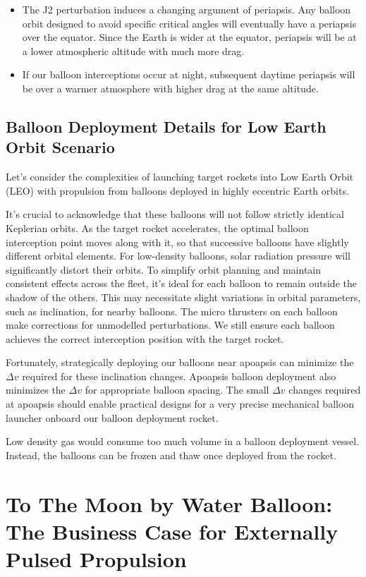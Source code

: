\documentclass{article}
\begin{document}
{\begin{itemize}
\item The J2 perturbation induces a changing argument of periapsis. Any balloon orbit designed to avoid specific critical angles will eventually have a periapsis over the equator.  Since the Earth is wider at the equator, periapsis will be at a lower atmospheric altitude with much more drag.
\item If our balloon interceptions occur at night, subsequent daytime periapsis will be over a warmer atmosphere with higher drag at the same altitude.
\end{itemize}

\subsection{Balloon Deployment Details for Low Earth Orbit Scenario}
Let's consider the complexities of launching target rockets into Low Earth Orbit (LEO) with propulsion from balloons deployed in highly eccentric Earth orbits.

It's crucial to acknowledge that these balloons will not follow strictly identical Keplerian orbits. As the target rocket accelerates, the optimal balloon interception point moves along with it, so that successive balloons have slightly different orbital elements.
For low-density balloons, solar radiation pressure will significantly distort their orbits. To simplify orbit planning and maintain consistent  effects across the fleet, it's ideal for each balloon to remain outside the shadow of the others. This may necessitate slight variations in orbital parameters, such as inclination, for nearby balloons. The micro thrusters on each balloon  make corrections for unmodelled perturbations.  We still ensure each balloon achieves the correct interception position with the target rocket.   

Fortunately, strategically deploying our balloons near apoapsis can minimize the $\Delta v$ required for these inclination changes. Apoapsis balloon deployment also minimizes the $\Delta v$ for appropriate balloon spacing. The small $\Delta v$ changes required at apoapsis should enable practical designs for a very precise mechanical balloon launcher onboard our balloon deployment rocket.

Low density gas would consume too much volume in a balloon deployment vessel.   Instead, the balloons can be frozen and thaw once deployed from the rocket.  
\section{To The Moon by Water Balloon:  The Business Case for Externally Pulsed Propulsion}   
}
\end{document}
